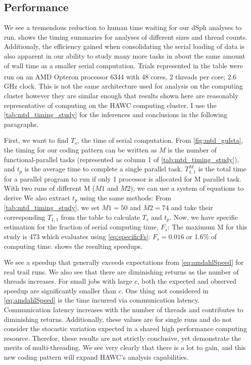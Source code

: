 \subsection{Performance}\label{sec:mtd_performance}



We see a tremendous reduction to human time waiting for our dSph analyses to run.
 shows the timing summaries for analyses of different sizes and thread counts.
Additionaly, the efficiency gained when consolidating the serial loading of data is also apparent in our ability to study many more tasks in about the same amount of wall time as a smaller serial computation.
Trials represented in the table were run on an AMD Opteron\textsuperscript{\textregistered} processor 6344 with 48 cores, 2 threads per core; 2.6 GHz clock.
This is not the same architecture used for analysis on the computing cluster however they are similar enough that results shown here are reasonably representative of computing on the HAWC computing cluster.
I use the \cref{tab:mtd_timing_study} for the inferences and conclusions in the following paragraphs.

First, we want to find $T_s$, the time of serial computation.
From \cref{fig:mtd_gufsta}, the timing for our coding pattern can be written as
\TimingAll
$M$ is the number of functional-parallel tasks (represented as column 1 of \cref{tab:mtd_timing_study}), and $t_p$ is the average time to complete a single parallel task.
$T^M_{1,1}$ is the total time for a parallel program to run if only 1 processor is allocated for M parallel task.
With two runs of different M ($M1$ and $M2$), we can use a system of equations to derive
\TsfromMs
We also extract $t_p$ using the same methods:
\TpfromMs
From \cref{tab:mtd_timing_study}, we set $M1 = 50$ and $M2 = 74$ and take their corresponding $T_{1,1}$ from the table to calculate $T_s$ and $t_p$.
Now, we have specific estimation for the fraction of serial computing time, $F_s$:
The maximum M for this study is 473 which evaluates using \cref{eq:specificFs}: $F_s = 0.016$ or 1.6\% of computing time.
 shows the resulting speedups.


We see a speedup that generally exceeds expectations from \cref{eq:amdahlSpeed} for real trail runs.
We also see that there are diminishing returns as the number of threads increases.
For small jobs with large $c$, both the expected and observed speedup are significantly smaller than $c$.
One thing not considered in \cref{eq:amdahlSpeed} is the time incurred via communication latency.
Communication latency increases with the number of threads and contributes to diminishing returns.
Additionally, these values are for single runs and do not consider the stocastic variation expected in a shared high performance computing resource.
Therefor, these results are not strictly conclusive, yet demonstrate the merits of multi-threading.
We see very clearly that there is a lot to gain, and this new coding pattern will expand HAWC's analysis capabilities.

